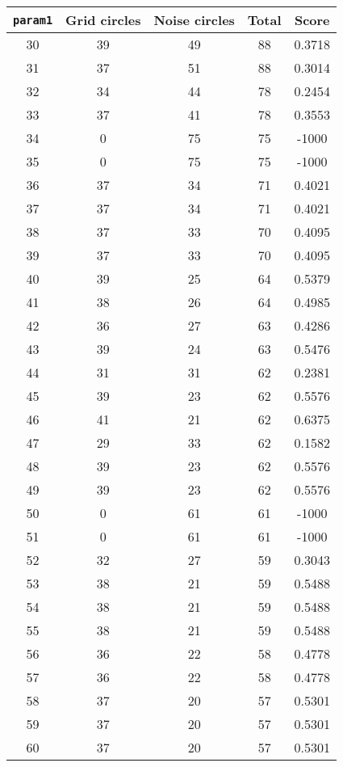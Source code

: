 \documentclass[letterpaper, 12pt]{article}
\begin{document}
\begin{longtable}{|c|c|c|c|c|}
\hline
\textbf{\texttt{param1}} & \textbf{Grid circles} & \textbf{Noise circles} & \textbf{Total} & \textbf{Score} \\
\hline
30 & 39 & 49 & 88 & 0.3718 \\
\hline
31 & 37 & 51 & 88 & 0.3014 \\
\hline
32 & 34 & 44 & 78 & 0.2454 \\
\hline
33 & 37 & 41 & 78 & 0.3553 \\
\hline
34 & 0 & 75 & 75 & -1000 \\
\hline
35 & 0 & 75 & 75 & -1000 \\
\hline
36 & 37 & 34 & 71 & 0.4021 \\
\hline
37 & 37 & 34 & 71 & 0.4021 \\
\hline
38 & 37 & 33 & 70 & 0.4095 \\
\hline
39 & 37 & 33 & 70 & 0.4095 \\
\hline
40 & 39 & 25 & 64 & 0.5379 \\
\hline
41 & 38 & 26 & 64 & 0.4985 \\
\hline
42 & 36 & 27 & 63 & 0.4286 \\
\hline
43 & 39 & 24 & 63 & 0.5476 \\
\hline
44 & 31 & 31 & 62 & 0.2381 \\
\hline
45 & 39 & 23 & 62 & 0.5576 \\
\hline
46 & 41 & 21 & 62 & 0.6375 \\
\hline
47 & 29 & 33 & 62 & 0.1582 \\
\hline
48 & 39 & 23 & 62 & 0.5576 \\
\hline
49 & 39 & 23 & 62 & 0.5576 \\
\hline
50 & 0 & 61 & 61 & -1000 \\
\hline
51 & 0 & 61 & 61 & -1000 \\
\hline
52 & 32 & 27 & 59 & 0.3043 \\
\hline
53 & 38 & 21 & 59 & 0.5488 \\
\hline
54 & 38 & 21 & 59 & 0.5488 \\
\hline
55 & 38 & 21 & 59 & 0.5488 \\
\hline
56 & 36 & 22 & 58 & 0.4778 \\
\hline
57 & 36 & 22 & 58 & 0.4778 \\
\hline
58 & 37 & 20 & 57 & 0.5301 \\
\hline
59 & 37 & 20 & 57 & 0.5301 \\
\hline
60 & 37 & 20 & 57 & 0.5301 \\

\end{longtable}
\end{document}
